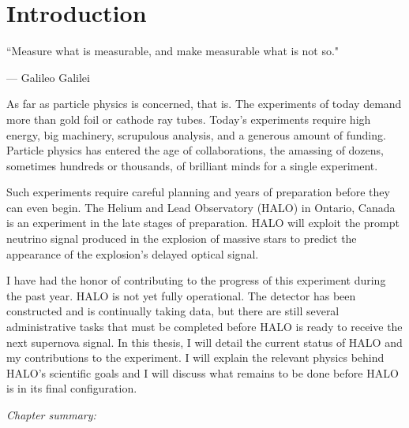 %
%
%
%


\chapter{Introduction}
	\label{intro_chapter}
	\vspace{-0.2in}

	\begin{quoting}
		\noindent \large ``Measure what is measurable, and make measurable what is not so." \normalsize

		--- Galileo Galilei
	\end{quoting}

	 As far as particle physics is concerned, that is. The experiments of today demand more than gold foil or cathode ray tubes. Today's experiments require high energy, big machinery, scrupulous analysis, and a generous amount of funding. Particle physics has entered the age of collaborations, the amassing of dozens, sometimes hundreds or thousands, of brilliant minds for a single experiment. 

	Such experiments require careful planning and years of preparation before they can even begin. The Helium and Lead Observatory (HALO) in Ontario, Canada is an experiment in the late stages of preparation. HALO will exploit the prompt neutrino signal produced in the explosion of massive stars to predict the appearance of the explosion's delayed optical signal. 

	I have had the honor of contributing to the progress of this experiment during the past year. HALO is not yet fully operational. The detector has been constructed and is continually taking data, but there are still several administrative tasks that must be completed before HALO is ready to receive the next supernova signal. In this thesis, I will detail the current status of HALO and my contributions to the experiment. I will explain the relevant physics behind HALO's scientific goals and I will discuss what remains to be done before HALO is in its final configuration.

	\vspace{0.3in}
	\noindent
	\emph{Chapter summary:}

